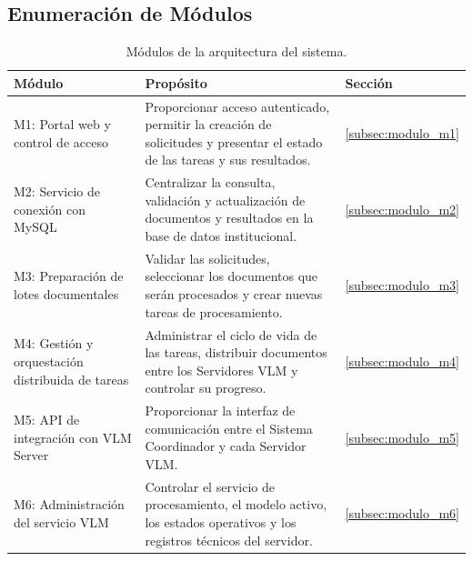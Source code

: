 \subsection{Enumeración de Módulos}
\label{subsec:enumeracion_modulos}

\begin{table}[H]
    \centering
    \footnotesize
    \renewcommand{\arraystretch}{1.15}
    \caption{Módulos de la arquitectura del sistema.}
    \label{tab:enumeracion_modulos}

    \begin{tabularx}{\textwidth}{
        >{\raggedright\arraybackslash}p{}
        >{\raggedright\arraybackslash}X
        >{\centering\arraybackslash}p{}
    }
        \toprule
        \textbf{Módulo} & \textbf{Propósito} & \textbf{Sección} \\
        \midrule

        M1: Portal web y control de acceso &
        Proporcionar acceso autenticado, permitir la creación de solicitudes y presentar el estado de las tareas y sus resultados. &
        \ref{subsec:modulo_m1} \\

        M2: Servicio de conexión con MySQL &
        Centralizar la consulta, validación y actualización de documentos y resultados en la base de datos institucional. &
        \ref{subsec:modulo_m2} \\

        M3: Preparación de lotes documentales &
        Validar las solicitudes, seleccionar los documentos que serán procesados y crear nuevas tareas de procesamiento. &
        \ref{subsec:modulo_m3} \\

        M4: Gestión y orquestación distribuida de tareas &
        Administrar el ciclo de vida de las tareas, distribuir documentos entre los Servidores VLM y controlar su progreso. &
        \ref{subsec:modulo_m4} \\

        M5: API de integración con VLM Server &
        Proporcionar la interfaz de comunicación entre el Sistema Coordinador y cada Servidor VLM. &
        \ref{subsec:modulo_m5} \\

        M6: Administración del servicio VLM &
        Controlar el servicio de procesamiento, el modelo activo, los estados operativos y los registros técnicos del servidor. &
        \ref{subsec:modulo_m6} \\


\end{tabularx}
\end{table}
